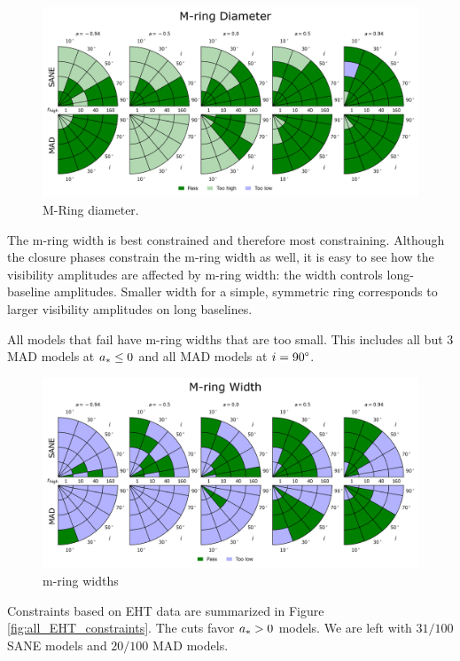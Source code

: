 \begin{figure}
  \centering
  \includegraphics[width=\columnwidth]{./figures/Mring_d_Constraints.png}
  \caption{M-Ring diameter.}
  \label{fig:cmp_m-ring_diam}
\end{figure}

The m-ring width is best constrained and therefore most constraining.  Although the closure phases constrain the m-ring width as well, it is easy to see how the visibility amplitudes are affected by m-ring width: the width controls long-baseline amplitudes. Smaller width for a simple, symmetric ring corresponds to larger visibility amplitudes on long baselines.  

All models that fail have m-ring widths that are too small.  This includes all but 3 MAD models at $a_* \le 0$ and all MAD models at $i = 90\degree$.

\begin{figure}
  \centering
  \includegraphics[width=\columnwidth]{./figures/Mring_w_Constraints.png}
  \caption{m-ring widths}
  \label{fig:cmp_m-ring_width}
\end{figure}


Constraints based on EHT data are summarized in Figure \ref{fig:all_EHT_constraints}.  The cuts favor $a_* > 0$ models.  We are left with $31/100$ SANE models and $20/100$ MAD models.


